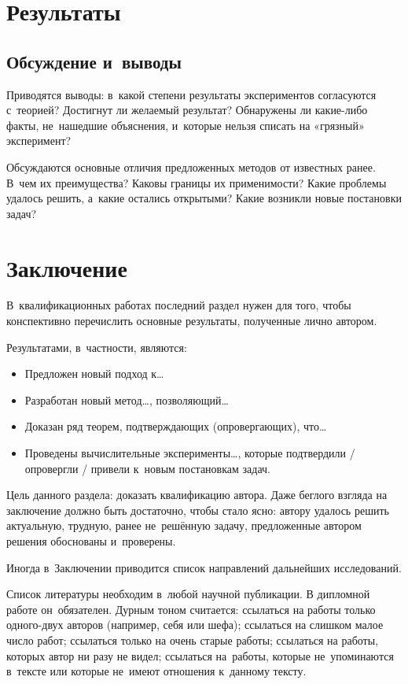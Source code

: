 \documentclass[12pt,fleqn]{article}
\begin{document}
\newpage

\section{Результаты}
	\par 

\subsection{Обсуждение и~выводы}
Приводятся выводы: 
в~какой степени результаты экспериментов согласуются с~теорией? 
Достигнут ли желаемый результат? 
Обнаружены ли какие-либо факты, не~нашедшие объяснения, и~которые нельзя списать на «грязный» эксперимент?

Обсуждаются основные отличия предложенных методов от известных ранее. 
В~чем их преимущества? 
Каковы границы их применимости? 
Какие проблемы удалось решить, а~какие остались открытыми? 
Какие возникли новые постановки задач?

\section{Заключение}

В~квалификационных работах последний раздел нужен для того, чтобы 
конспективно перечислить основные результаты, полученные лично автором. 

Результатами, в~частности, являются:
\begin{itemize}
\item 
    Предложен новый подход к\dots
\item 
    Разработан новый метод\dots, позволяющий\dots
\item 
    Доказан ряд теорем, подтверждающих (опровергающих), что\dots
\item 
    Проведены вычислительные эксперименты\dots,
    которые подтвердили / опровергли / привели к~новым постановкам задач.
\end{itemize}
    
Цель данного раздела: доказать квалификацию автора. 
Даже беглого взгляда на заключение должно быть достаточно, чтобы стало ясно: 
автору удалось решить актуальную, трудную, ранее не~решённую задачу, 
предложенные автором решения обоснованы и~проверены.

Иногда в~Заключении приводится список направлений дальнейших исследований.

\newpage
Список литературы необходим в~любой научной публикации. 
В дипломной работе он~обязателен. 
Дурным тоном считается:
ссылаться на работы только одного-двух авторов (например, себя или шефа);
ссылаться на слишком малое число работ;
ссылаться только на очень старые работы;
ссылаться на работы, которых автор ни разу не видел;
ссылаться на~работы, которые не~упоминаются в~тексте
или которые не~имеют отношения к~данному тексту.
\end{document}
